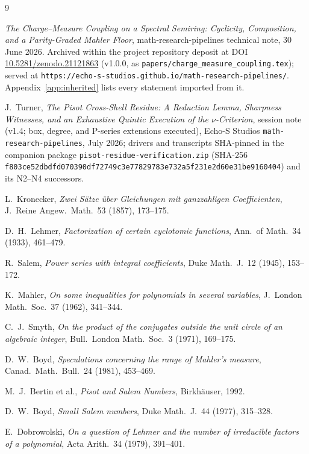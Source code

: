 \documentclass[11pt]{article}
\theoremstyle{plain}
\theoremstyle{definition}
\theoremstyle{remark}
\begin{document}
\begin{thebibliography}{9}

 \emph{The Charge--Measure Coupling on a Spectral Semiring:
Cyclicity, Composition, and a Parity-Graded Mahler Floor},
math-research-pipelines technical note, 30 June 2026. Archived within the project repository deposit at DOI
\url{10.5281/zenodo.21121863} (v1.0.0, as
\texttt{papers/charge\_measure\_coupling.tex}); served at
\texttt{https://echo-s-studios.github.io/math-research-pipelines/}.
Appendix~\ref{app:inherited} lists every statement imported from it.

 J.~Turner, \emph{The Pisot Cross-Shell Residue: A
Reduction Lemma, Sharpness Witnesses, and an Exhaustive Quintic Execution
of the $\nu$-Criterion}, session note (v1.4; box, degree, and P-series
extensions executed), Echo-S Studios \texttt{math-research-pipelines},
July 2026; drivers and transcripts SHA-pinned in the companion package
\texttt{pisot-residue-verification.zip} (SHA-256
\texttt{f803ce52dbdfd070}\allowbreak\texttt{390df72749c3e778}\allowbreak\texttt{29783e732a5f231e}\allowbreak\texttt{2d60e31be9160404}) and its N2--N4 successors.

 L.~Kronecker, \emph{Zwei S\"atze \"uber Gleichungen mit
ganzzahligen Coefficienten}, J.~Reine Angew.~Math.\ 53 (1857), 173--175.

 D.~H.~Lehmer, \emph{Factorization of certain cyclotomic
functions}, Ann.\ of Math.\ 34 (1933), 461--479.

 R.~Salem, \emph{Power series with integral coefficients},
Duke Math.~J.\ 12 (1945), 153--172.

 K.~Mahler, \emph{On some inequalities for polynomials in
several variables}, J.~London Math.~Soc.\ 37 (1962), 341--344.

 C.~J.~Smyth, \emph{On the product of the conjugates outside the
unit circle of an algebraic integer}, Bull.~London Math.~Soc.\ 3 (1971),
169--175.

 D.~W.~Boyd, \emph{Speculations concerning the range of Mahler's
measure}, Canad.~Math.~Bull.\ 24 (1981), 453--469.

 M.~J.~Bertin et al., \emph{Pisot and Salem Numbers},
Birkh\"auser, 1992.

 D.~W.~Boyd, \emph{Small Salem numbers}, Duke Math.~J.\
44 (1977), 315--328.

 E.~Dobrowolski, \emph{On a question of Lehmer and the
number of irreducible factors of a polynomial}, Acta Arith.\ 34 (1979),
391--401.


\end{thebibliography}
\end{document}
